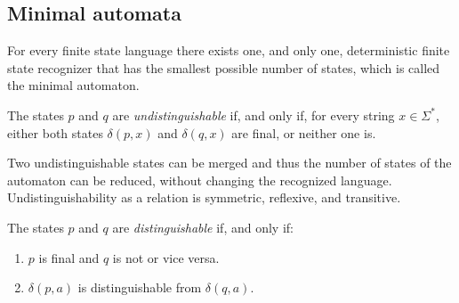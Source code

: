 \subsection*{Minimal automata}
\begin{property}
    For every finite state language there exists one, and only one, deterministic finite state recognizer that has the smallest possible number of states, which is called the minimal automaton.
\end{property}   
\begin{definition}
    The states $p$ and $q$ are \emph{undistinguishable} if, and only if, for every string $x \in \Sigma^{*}$, either both states $\delta(p,x)$ and $\delta(q,x)$ are final, or neither one is. 
\end{definition}
Two undistinguishable states can be merged and thus the number of states of the automaton can be reduced, without changing the recognized language.
Undistinguishability as a relation is symmetric, reflexive, and transitive. 
\begin{definition}
    The states $p$ and $q$ are \emph{distinguishable} if, and only if:
    \begin{enumerate}
        \item $p$ is final and $q$ is not or vice versa. 
        \item $\delta(p,a)$ is distinguishable from $\delta(q,a)$.
    \end{enumerate}
\end{definition}
